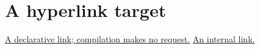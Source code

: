 \documentclass{article}
\begin{document}
\section{A hyperlink target}\label{sec:target}
\href{https://example.invalid/}{A declarative link; compilation makes no request.}
\hyperref[sec:target]{An internal link.}
\end{document}
